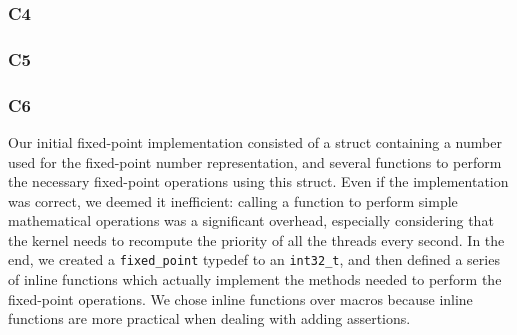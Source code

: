 \documentclass[a4wide, 11pt]{article}
\newcommand{\tx}{\texttt}
\begin{document}
\subsubsection{C4}

\subsubsection{C5}

\subsubsection{C6}

Our initial fixed-point implementation consisted of a struct containing a number used for the fixed-point number representation, and several functions to perform the necessary fixed-point operations using this struct. Even if the implementation was correct, we deemed it inefficient: calling a function to perform simple mathematical operations was a significant overhead, especially considering that the kernel needs to recompute the priority of all the threads every second. In the end, we created a \tx{fixed\_point} typedef to an \tx{int32\_t}, and then defined a series of inline functions which actually implement the methods needed to perform the fixed-point operations. We chose inline functions over macros because inline functions are more practical when dealing with adding assertions.
\end{document}
